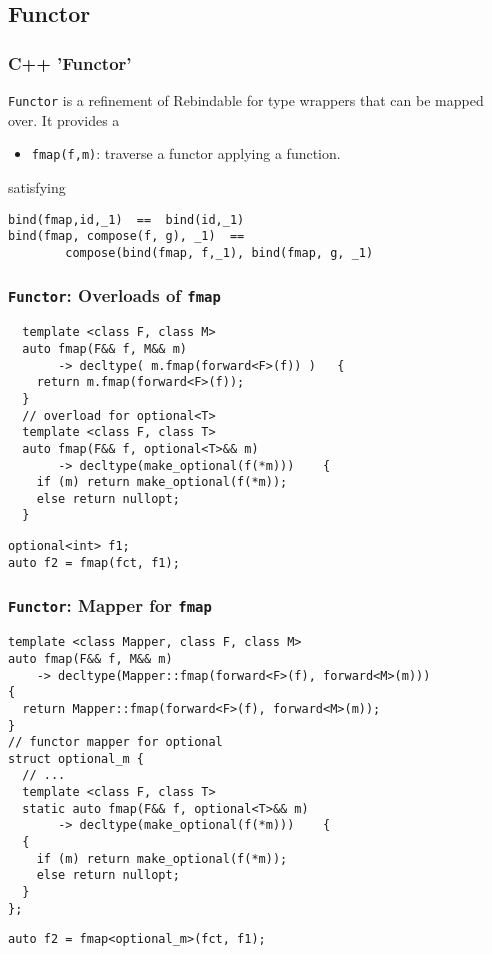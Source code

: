 \documentclass[xcolor=dvipsnames]{beamer}
\newcommand{\cpp}[1]{\lstinline{#1}}
\begin{document}
\subsection{Functor}
\begin{frame}[fragile]
\frametitle{C++ 'Functor'}

\cpp{Functor} is a refinement of Rebindable for type wrappers that can be mapped over.  It provides a

\begin{itemize}
  \item \cpp{fmap(f,m)}: traverse a functor applying a function.
\end{itemize}
        
satisfying

\begin{lstlisting}
bind(fmap,id,_1)  ==  bind(id,_1)
bind(fmap, compose(f, g), _1)  ==  
        compose(bind(fmap, f,_1), bind(fmap, g, _1)
\end{lstlisting}

\end{frame}
\begin{frame}[fragile]
\frametitle{\cpp{Functor}: Overloads of \cpp{fmap}}

\begin{lstlisting}
  template <class F, class M>
  auto fmap(F&& f, M&& m)
       -> decltype( m.fmap(forward<F>(f)) )   {
    return m.fmap(forward<F>(f));
  }
  // overload for optional<T>
  template <class F, class T>
  auto fmap(F&& f, optional<T>&& m) 
       -> decltype(make_optional(f(*m)))    {
    if (m) return make_optional(f(*m));
    else return nullopt;
  }
\end{lstlisting}

\begin{lstlisting}
optional<int> f1;
auto f2 = fmap(fct, f1); 
\end{lstlisting}

\end{frame}
\begin{frame}[fragile]
\frametitle{\cpp{Functor}: Mapper for \cpp{fmap}}

\begin{lstlisting}
template <class Mapper, class F, class M>
auto fmap(F&& f, M&& m)
    -> decltype(Mapper::fmap(forward<F>(f), forward<M>(m)))
{
  return Mapper::fmap(forward<F>(f), forward<M>(m));
}
// functor mapper for optional
struct optional_m {
  // ...
  template <class F, class T>
  static auto fmap(F&& f, optional<T>&& m) 
       -> decltype(make_optional(f(*m)))    {
  {
    if (m) return make_optional(f(*m));
    else return nullopt;
  }
};
\end{lstlisting}

\begin{lstlisting}
auto f2 = fmap<optional_m>(fct, f1); 
\end{lstlisting}

\end{frame}
\end{document}

